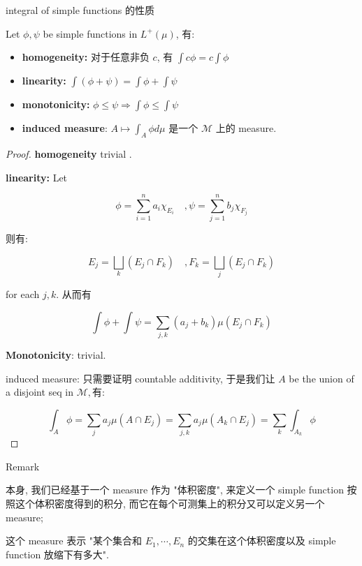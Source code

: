 \documentclass{qlnotes-export}
\begin{document}
\begin{proposition}{integral of simple functions 的性质}\label{prop-04-measurable-functions-and-integration-on-l-mu-integral-of-simple-functions}

Let \(\phi,\psi\) be simple functions in \(L^{+}(\mu)\), 有:

\begin{itemize}
\item
  \textbf{homogeneity:} 对于任意非负 \(c\), 有 \(\int c\phi = c\int\phi\)
\item
  \textbf{linearity:} \(\int(\phi + \psi) = \int\phi + \int\psi\)
\item
  \textbf{monotonicity:} \(\phi \leq \psi\Longrightarrow\int\phi \leq \int\psi\)
\item
  \textbf{induced measure}: \(A\mapsto\int_{A}\phi d\mu\) 是一个 \(\mathcal{M}\) 上的 measure.
\end{itemize}

\end{proposition}

\begin{proof}

\textbf{homogeneity} trivial .

\textbf{linearity:} Let

\[\phi = \sum\limits_{i = 1}^{n}a_{i}\chi_{E_{i}}\quad,\psi = \sum\limits_{j = 1}^{n}b_{j}\chi_{F_{j}}\]

则有:

\[E_{j} = \bigsqcup\limits_{k}(E_{j} \cap F_{k})\quad,F_{k} = \bigsqcup\limits_{j}(E_{j} \cap F_{k})\]

for each \(j,k\). 从而有

\[\int\phi + \int\psi = \sum\limits_{j,k}(a_{j} + b_{k})\mu(E_{j} \cap F_{k})\]

\textbf{Monotonicity}: trivial.

induced measure: 只需要证明 countable additivity, 于是我们让 \(A\) be the union of a disjoint seq in \(\mathcal{M},有:\)

\[\int_{A}\phi = \sum\limits_{j}a_{j}\mu(A \cap E_{j}) = \sum\limits_{j,k}a_{j}\mu(A_{k} \cap E_{j}) = \sum\limits_{k}\int_{A_{k}}\phi\]

\end{proof}

\begin{qlremark}{Remark}

本身, 我们已经基于一个 measure 作为 "体积密度", 来定义一个 simple function 按照这个体积密度得到的积分, 而它在每个可测集上的积分又可以定义另一个 measure;

这个 measure 表示 "某个集合和 \(E_{1},\cdots,E_{n}\) 的交集在这个体积密度以及 simple function 放缩下有多大".

\end{qlremark}
\end{document}

